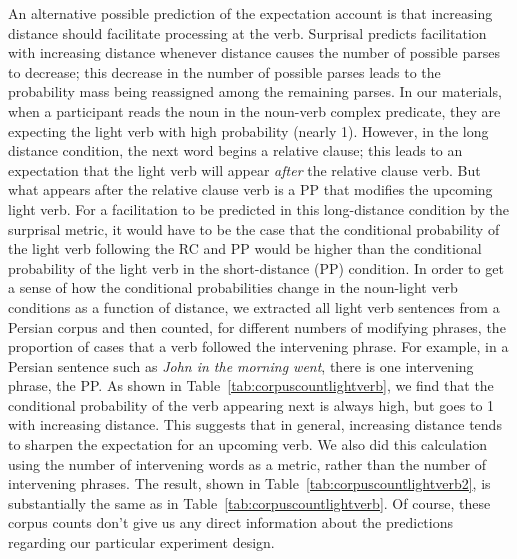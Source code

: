 \documentclass{frontiersSCNS}\usepackage{knitr} %
\begin{document}
An alternative possible prediction of the expectation account is that increasing distance should facilitate processing at the verb. Surprisal predicts facilitation with increasing distance whenever distance causes the number of possible parses to decrease; this decrease in the number of possible parses leads to the probability mass being reassigned among the remaining parses. 
In our materials,  when a participant reads the noun in the noun-verb complex predicate, they are expecting the light verb with high probability (nearly 1). However, in the long distance condition, the next word begins a relative clause; this leads to an expectation that the light verb will appear \textit{after} the relative clause verb. But what appears after the relative clause verb is a PP that modifies the upcoming light verb.  For a facilitation to be predicted in this long-distance condition by the surprisal metric, it would have to be the case that the conditional probability of the light verb following the RC and PP would be higher than the conditional probability of the light verb in the short-distance (PP) condition. 
In order to get a sense of how the conditional probabilities change in the noun-light verb conditions as a function of distance, we extracted all light verb sentences from a Persian corpus \citep{Mojganphd} and then counted, for different numbers of modifying phrases, the proportion of cases that a verb followed the intervening phrase.  For example, in a Persian sentence such as \textit{John in the morning went}, there is one intervening phrase, the PP.
As shown in Table~\ref{tab:corpuscountlightverb}, we find that the conditional probability of the verb appearing next is always high, but goes to 1 with increasing distance. This suggests that in general, increasing distance tends to sharpen the expectation for an upcoming verb.  
We also did this calculation using the number of intervening words as a metric, rather than the number of intervening phrases. The result, shown in Table~\ref{tab:corpuscountlightverb2}, is substantially the same as in Table~\ref{tab:corpuscountlightverb}.
Of course, these corpus counts don't give us any direct information about the predictions regarding our particular experiment design.
\end{document}
